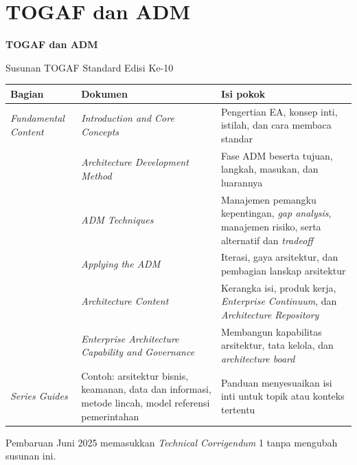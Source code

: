 \documentclass[aspectratio=169, table, 12pt]{beamer}
\begin{document}
\section{TOGAF dan ADM}

\begin{frame}{\hfill}
  \centering
  \Huge{\textbf{TOGAF dan ADM}}
\end{frame}

\begin{frame}{{\Large Susunan TOGAF Standard Edisi Ke-10}}
  \scriptsize
  \begin{tabularx}{\textwidth}{>{\raggedright\arraybackslash}p{2.0cm}
      >{\raggedright\arraybackslash}p{4.3cm} >{\raggedright\arraybackslash}X}
    \hline
    \textbf{Bagian} & \textbf{Dokumen} & \textbf{Isi pokok} \\
    \hline
    \textit{Fundamental Content} & \textit{Introduction and Core Concepts} & Pengertian EA, konsep inti, istilah, dan cara membaca standar \\
    \hline
     & \textit{Architecture Development Method} & Fase ADM beserta tujuan, langkah, masukan, dan luarannya \\
    \hline
     & \textit{ADM Techniques} & Manajemen pemangku kepentingan, \textit{gap analysis}, manajemen risiko, serta alternatif dan \textit{tradeoff} \\
    \hline
     & \textit{Applying the ADM} & Iterasi, gaya arsitektur, dan pembagian lanskap arsitektur \\
    \hline
     & \textit{Architecture Content} & Kerangka isi, produk kerja, \textit{Enterprise Continuum}, dan \textit{Architecture Repository} \\
    \hline
     & \textit{Enterprise Architecture Capability and Governance} & Membangun kapabilitas arsitektur, tata kelola, dan \textit{architecture board} \\
    \hline
    \textit{Series Guides} & Contoh: arsitektur bisnis, keamanan, data dan informasi, metode lincah, model referensi pemerintahan & Panduan menyesuaikan isi inti untuk topik atau konteks tertentu \\
    \hline
  \end{tabularx}

  \vspace{6pt}
  \small Pembaruan Juni 2025 memasukkan \textit{Technical Corrigendum} 1 tanpa mengubah susunan ini.
\end{frame}
\end{document}
